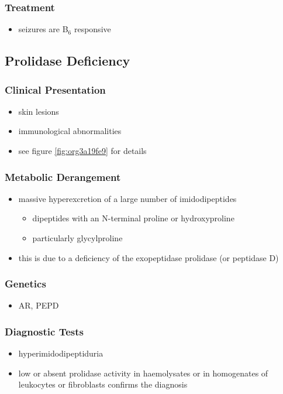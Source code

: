 \documentclass{scrartcl}
\begin{document}
\subsubsection{Treatment}
\label{sec:orgd12b34e}
\begin{itemize}
\item seizures are B\(_{\text{6}}\) responsive
\end{itemize}

\subsection{Prolidase Deficiency}
\label{sec:org695ec99}
\subsubsection{Clinical Presentation}
\label{sec:orge413ead}
\begin{itemize}
\item skin lesions
\item immunological abnormalities
\item see figure \ref{fig:org3a19fe9} for details
\end{itemize}
\subsubsection{Metabolic Derangement}
\label{sec:orga136e81}
\begin{itemize}
\item massive hyperexcretion of a large number of imidodipeptides
\begin{itemize}
\item dipeptides with an N-terminal proline or hydroxyproline
\item particularly glycylproline
\end{itemize}
\item this is due to a deficiency of the exopeptidase prolidase (or
peptidase D)
\end{itemize}
\subsubsection{Genetics}
\label{sec:org7075332}
\begin{itemize}
\item AR, PEPD
\end{itemize}
\subsubsection{Diagnostic Tests}
\label{sec:orgb86a151}
\begin{itemize}
\item hyperimidodipeptiduria
\item low or absent prolidase activity in haemolysates or in homogenates
of leukocytes or fibroblasts confirms the diagnosis
\end{itemize}
\end{document}
